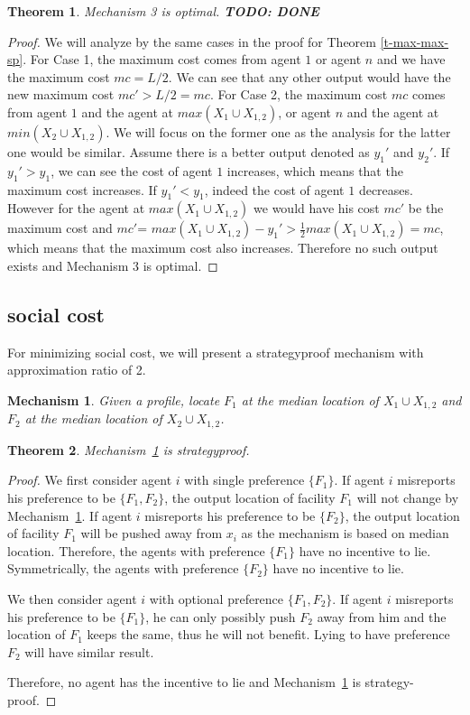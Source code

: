 \documentclass[twoside,11pt]{article}
\newtheorem{theorem}{Theorem}
\newtheorem{mechanism}{Mechanism}
\newcommand{\todo}[1]{}
\renewcommand{\todo}[1]{{\textbf{\color{red} TODO: {#1}}}}
\begin{document}
\begin{theorem}\label{t-max-max-lower}
Mechanism 3 is optimal.
\todo{DONE}
\end{theorem}
\begin{proof}
We will analyze by the same cases in the proof for Theorem \ref{t-max-max-sp}. For Case 1, the maximum cost comes from agent $1$ or agent $n$ and we have the maximum cost $mc=L/2$. We can see that any other output would have the new maximum cost $mc'>L/2=mc$. For Case 2, the maximum cost $mc$ comes from agent $1$ and the agent at $max (X_{1} \cup X_{1,2})$, or agent $n$ and the agent at $min (X_{2} \cup X_{1,2})$. We will focus on the former one as the analysis for the latter one would be similar. Assume there is a better output denoted as $y_1'$ and $y_2'$. If $y_1'>y_1$, we can see the cost of agent $1$ increases, which means that the maximum cost increases. If $y_1'<y_1$, indeed the cost of agent $1$ decreases. However for the agent at $max (X_{1} \cup X_{1,2})$ we would have his cost $mc'$ be the maximum cost and $mc'$= $max (X_{1} \cup X_{1,2}) - y_1' > \frac{1}{2}max (X_{1} \cup X_{1,2}) = mc$, which means that the maximum cost also increases. Therefore no such output exists and Mechanism 3 is optimal.
\end{proof}
\subsection{social cost}
\label{sec-max-social}
For minimizing social cost, we will present a strategyproof mechanism with approximation ratio of 2.

\begin{mechanism}
\label{mech-socialmax}
Given a profile, locate $F_{1}$ at the median location of $X_{1} \cup X_{1,2}$ and $F_{2}$ at the median location of $X_{2} \cup X_{1,2}$.
\end{mechanism}

\begin{theorem}\label{t-max-social-sp}
Mechanism~\ref{mech-socialmax} is strategyproof.
\end{theorem}
\begin{proof}
We first consider agent $i$ with single preference $\{F_1\}$.
If agent $i$ misreports his preference to be $\{F_{1}, F_{2}\}$, the output location of facility $F_1$ will not change by Mechanism~\ref{mech-socialmax}.
If agent $i$ misreports his preference to be $\{ F_{2}\}$, the output location of facility $F_1$ will be pushed away from $x_i$ as the mechanism is based on median location.
Therefore, the agents with preference $\{F_1\}$ have no incentive to lie.
Symmetrically, the agents with preference $\{F_2\}$ have no incentive to lie.

We then consider agent $i$ with optional preference $\{F_1,F_2\}$.
If agent $i$ misreports his preference to be $\{F_{1}\}$, he can only possibly push $F_{2}$ away from him and the location of $F_{1}$ keeps the same, thus he will not benefit.
Lying to have preference $F_{2}$ will have similar result.

Therefore, no agent has the incentive to lie and
Mechanism~\ref{mech-socialmax} is strategy-proof.
\end{proof}
\end{document}
